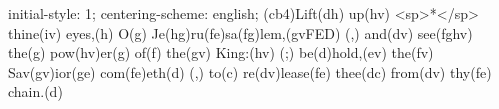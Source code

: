 initial-style: 1;
centering-scheme: english;
(cb4)Lift(dh) up(hv) <sp>*</sp> thine(iv) eyes,(h) O(g) Je(hg)ru(fe)sa(fg)lem,(gvFED) (,) and(dv) see(fghv) the(g) pow(hv)er(g) of(f) the(gv) King:(hv) (;) be(d)hold,(ev) the(fv) Sav(gv)ior(ge) com(fe)eth(d) (,) to(c) re(dv)lease(fe) thee(dc) from(dv) thy(fe) chain.(d)
